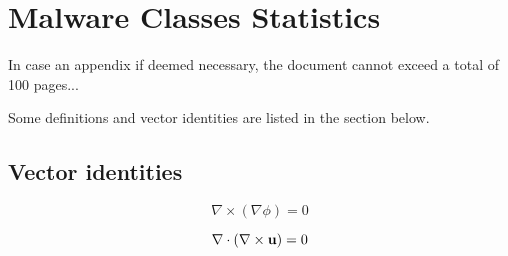 
\chapter{Malware Classes Statistics}
\label{chapter:appendixClasses}

In case an appendix if deemed necessary, the document cannot exceed a total of 100 pages...

Some definitions and vector identities are listed in the section below.

\section{Vector identities}
\label{section:vectorIdentities}

\begin{equation}
	\nabla \times \left( \nabla \phi \right) = 0
	\label{eq:cross_nnp}
\end{equation}

\begin{equation}
	\nabla \cdot \left( \nabla \times {\bf u} \right) = 0
	\label{eq:dotCross_nnu}
\end{equation}

